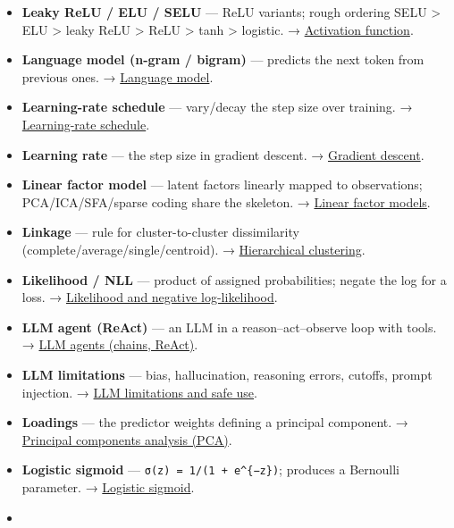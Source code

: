 \documentclass[
  10pt,
  letterpaper,
  onecolumn]{article}
\begin{document}
\begin{itemize}
  (batch-independent); transformer default. →
  \protect\hyperlink{layer-normalization}{Layer normalization}.
\item
  \textbf{Leaky ReLU / ELU / SELU} --- ReLU variants; rough ordering
  SELU \textgreater{} ELU \textgreater{} leaky ReLU \textgreater{} ReLU
  \textgreater{} tanh \textgreater{} logistic. →
  \protect\hyperlink{activation-function}{Activation function}.
\item
  \textbf{Language model (n-gram / bigram)} --- predicts the next token
  from previous ones. → \protect\hyperlink{language-model}{Language
  model}.
\item
  \textbf{Learning-rate schedule} --- vary/decay the step size over
  training. → \protect\hyperlink{learning-rate-schedule}{Learning-rate
  schedule}.
\item
  \textbf{Learning rate} --- the step size in gradient descent. →
  \protect\hyperlink{gradient-descent}{Gradient descent}.
\item
  \textbf{Linear factor model} --- latent factors linearly mapped to
  observations; PCA/ICA/SFA/sparse coding share the skeleton. →
  \protect\hyperlink{linear-factor-models}{Linear factor models}.
\item
  \textbf{Linkage} --- rule for cluster-to-cluster dissimilarity
  (complete/average/single/centroid). →
  \protect\hyperlink{hierarchical-clustering}{Hierarchical clustering}.
\item
  \textbf{Likelihood / NLL} --- product of assigned probabilities;
  negate the log for a loss. →
  \protect\hyperlink{likelihood-and-negative-log-likelihood}{Likelihood
  and negative log-likelihood}.
\item
  \textbf{LLM agent (ReAct)} --- an LLM in a reason--act--observe loop
  with tools. → \protect\hyperlink{llm-agents-chains-react}{LLM agents
  (chains, ReAct)}.
\item
  \textbf{LLM limitations} --- bias, hallucination, reasoning errors,
  cutoffs, prompt injection. →
  \protect\hyperlink{llm-limitations-and-safe-use}{LLM limitations and
  safe use}.
\item
  \textbf{Loadings} --- the predictor weights defining a principal
  component. →
  \protect\hyperlink{principal-components-analysis-pca}{Principal
  components analysis (PCA)}.
\item
  \textbf{Logistic sigmoid} --- \texttt{σ(z)\ =\ 1/(1\ +\ e\^{}\{−z\})};
  produces a Bernoulli parameter. →
  \protect\hyperlink{logistic-sigmoid}{Logistic sigmoid}.
\item

\end{itemize}
\end{document}
